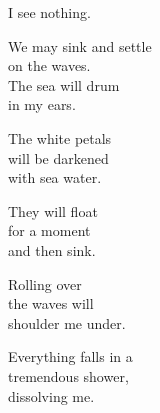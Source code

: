 \documentclass[10pt, letterpaper]{memoir}
\begin{document}
\vspace{1em}
\begin{minipage}{0.3\textwidth}
	\begin{center}
		I see nothing.

		We may sink and settle\\
		on the waves.\\
		The sea will drum\\
		in my ears.

		The white petals\\
		will be darkened\\
		with sea water.

		They will float\\
		for a moment\\
		and then sink.

		Rolling over\\
		the waves will\\
		shoulder me under.

		Everything falls in a\\
		tremendous shower,\\
		dissolving me.
	\end{center}
\end{minipage}
\end{document}
